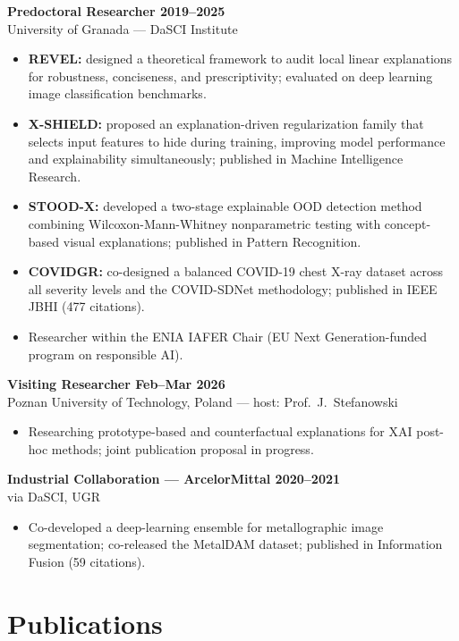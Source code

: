 \documentclass[10pt,a4paper]{article}
\newcommand{\blueitem}[1]{\textcolor{subtitleblue}{\textbf{#1}}}
\newcommand{\sub}[1]{\textcolor{subtle}{\footnotesize #1}}
\begin{document}
\blueitem{Predoctoral Researcher \hfill 2019--2025} \\
\sub{University of Granada --- DaSCI Institute}
\begin{itemize}
    \item \textbf{REVEL:} designed a theoretical framework to audit local linear explanations for robustness, conciseness, and prescriptivity; evaluated on deep learning image classification benchmarks.
    \item \textbf{X-SHIELD:} proposed an explanation-driven regularization family that selects input features to hide during training, improving model performance and explainability simultaneously; published in Machine Intelligence Research.
    \item \textbf{STOOD-X:} developed a two-stage explainable OOD detection method combining Wilcoxon-Mann-Whitney nonparametric testing with concept-based visual explanations; published in Pattern Recognition.
    \item \textbf{COVIDGR:} co-designed a balanced COVID-19 chest X-ray dataset across all severity levels and the COVID-SDNet methodology; published in IEEE JBHI (477 citations).
    \item Researcher within the ENIA IAFER Chair (EU Next Generation-funded program on responsible AI).
\end{itemize}

\blueitem{Visiting Researcher \hfill Feb--Mar 2026} \\
\sub{Poznan University of Technology, Poland --- host: Prof.~J.~Stefanowski}
\begin{itemize}
    \item Researching prototype-based and counterfactual explanations for XAI post-hoc methods; joint publication proposal in progress.
\end{itemize}

\blueitem{Industrial Collaboration --- ArcelorMittal \hfill 2020--2021} \\
\sub{via DaSCI, UGR}
\begin{itemize}
    \item Co-developed a deep-learning ensemble for metallographic image segmentation; co-released the MetalDAM dataset; published in Information Fusion (59 citations).
\end{itemize}

\section*{Publications}
\end{document}

